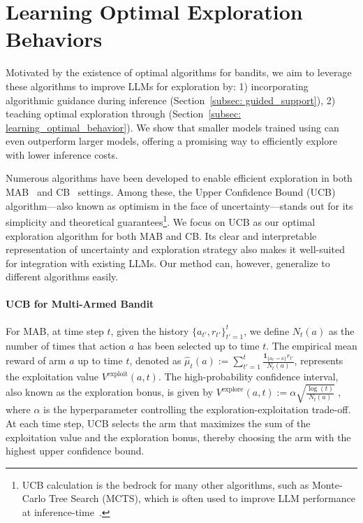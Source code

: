 
\section{Learning Optimal Exploration Behaviors}


Motivated by the existence of optimal algorithms for bandits, we aim to leverage these algorithms to improve LLMs for exploration by:  1) incorporating algorithmic guidance during inference (Section~\ref{subsec: guided_support}),
2) teaching optimal exploration through \ad (Section~\ref{subsec: learning_optimal_behavior}). We show that smaller models trained using \ad can even outperform larger models, offering a promising way to efficiently explore with lower inference costs.

Numerous algorithms have been developed to enable efficient exploration in both MAB~\citep{auer2002finite} and CB~\citep{langford2007epoch,li2010contextual} settings. Among these, the Upper Confidence Bound (UCB) algorithm—also known as optimism in the face of uncertainty—stands out for its simplicity and theoretical guarantees\footnote{UCB calculation is the bedrock for many other algorithms, such as Monte-Carlo Tree Search (MCTS), which is often used to improve LLM performance at inference-time~\citep{snell2024scaling}.}. 
We focus on UCB as our optimal exploration algorithm for both MAB and CB. Its clear and interpretable representation of uncertainty and exploration strategy also makes it well-suited for integration with existing LLMs. Our method can, however, generalize to different algorithms easily.

\paragraph{UCB for Multi-Armed Bandit}
For MAB, at time step $t$, given the history $\{a_{t'}, r_{t'}\}_{t'=1}^t$, we define $N_t(a)$ as the number of times that action $a$ has been selected up to time $t$. The empirical mean reward of arm $a$ up to time $t$, denoted as $\hat{\mu}_t(a):=\sum_{t'=1}^t \frac{\mathbf{1}_{\{a_{t'}=a\}}r_{t'}}{N_t(a)}$, represents the exploitation value $V^{\text{exploit}}(a,t)$. The high-probability confidence interval, also known as the exploration bonus, is given by $V^{\text{explore}}(a,t):=\alpha\sqrt{\frac{\log(t)}{N_t(a)}}$ , where $\alpha$ is the hyperparameter controlling the exploration-exploitation trade-off. At each time step, UCB selects the arm that maximizes the sum of the exploitation value and the exploration bonus, thereby choosing the arm with the highest upper confidence bound.

